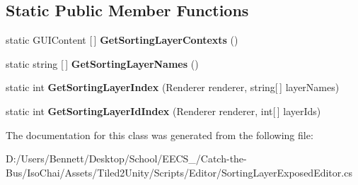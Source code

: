 \subsection*{Static Public Member Functions}
\begin{DoxyCompactItemize}
\item 
\mbox{\label{class_sorting_layer_exposed_editor_a3a80907acc6f4ebc060d072af00fda81}} 
static G\+U\+I\+Content \mbox{[}$\,$\mbox{]} {\bfseries Get\+Sorting\+Layer\+Contexts} ()
\item 
\mbox{\label{class_sorting_layer_exposed_editor_a5fe8e0af24db48e01353b98ed02a3768}} 
static string \mbox{[}$\,$\mbox{]} {\bfseries Get\+Sorting\+Layer\+Names} ()
\item 
\mbox{\label{class_sorting_layer_exposed_editor_afbc49b8a12d797616c8afda74ed86aac}} 
static int {\bfseries Get\+Sorting\+Layer\+Index} (Renderer renderer, string\mbox{[}$\,$\mbox{]} layer\+Names)
\item 
\mbox{\label{class_sorting_layer_exposed_editor_a9d280defdaf4d581d17333c339e3e76a}} 
static int {\bfseries Get\+Sorting\+Layer\+Id\+Index} (Renderer renderer, int\mbox{[}$\,$\mbox{]} layer\+Ids)
\end{DoxyCompactItemize}


The documentation for this class was generated from the following file\+:\begin{DoxyCompactItemize}
\item 
D\+:/\+Users/\+Bennett/\+Desktop/\+School/\+E\+E\+C\+S\+\_/\+Catch-\/the-\/\+Bus/\+Iso\+Chai/\+Assets/\+Tiled2\+Unity/\+Scripts/\+Editor/Sorting\+Layer\+Exposed\+Editor.\+cs\end{DoxyCompactItemize}
